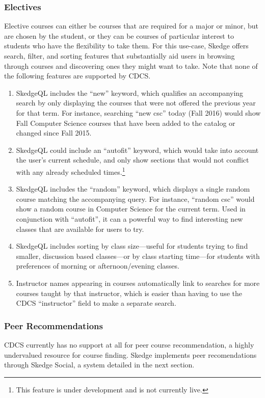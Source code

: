   \subsubsection{Electives}

  Elective courses can either be courses that are required for a major or minor, but are chosen by the student, or they can be courses of particular interest to students who have the flexibility to take them. For this use-case, Skedge offers search, filter, and sorting features that substantially aid users in browsing through courses and discovering ones they might want to take. Note that none of the following features are supported by CDCS.

  \begin{enumerate}

    \item SkedgeQL includes the ``new'' keyword, which qualifies an accompanying search by only displaying the courses that were not offered the previous year for that term. For instance, searching ``new csc'' today (Fall 2016) would show Fall Computer Science courses that have been added to the catalog or changed since Fall 2015.
    \item SkedgeQL could include an ``autofit'' keyword, which would take into account the user's current schedule, and only show sections that would not conflict with any already scheduled times.\footnote{This feature is under development and is not currently live.}
    \item SkedgeQL includes the ``random'' keyword, which displays a single random course matching the accompanying query. For instance, ``random csc'' would show a random course in Computer Science for the current term. Used in conjunction with ``autofit'', it can a powerful way to find interesting new classes that are available for users to try.
    \item SkedgeQL includes sorting by class size---useful for students trying to find smaller, discussion based classes---or by class starting time---for students with preferences of morning or afternoon/evening classes.
    \item Instructor names appearing in courses automatically link to searches for more courses taught by that instructor, which is easier than having to use the CDCS ``instructor'' field to make a separate search.

  \end{enumerate}

  \subsubsection{Peer Recommendations}

  CDCS currently has no support at all for peer course recommendation, a highly undervalued resource for course finding. Skedge implements peer recomendations through Skedge Social, a system detailed in the next section.
  